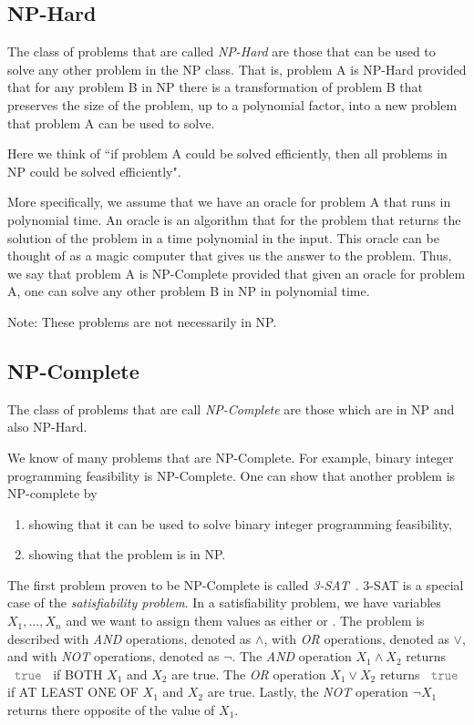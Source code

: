 \documentclass[../open-optimization/open-optimization.tex]{subfiles}
\begin{document}
\subsection{NP-Hard}
The class of problems that are called \emph{NP-Hard} are those that can be used to solve any other problem in the NP class.  
That is, problem A is NP-Hard provided that for any problem B in NP there is a transformation of problem B that preserves the size of the problem, up to a polynomial factor, into a new problem that problem A can be used to solve.

Here we think of ``if problem A could be solved efficiently, then all problems in NP could be solved efficiently".

More specifically, we assume that we have an oracle for problem A that runs in polynomial time.  An oracle is an algorithm that for the problem that returns the solution of the problem in a time polynomial in the input.   This oracle can be thought of as a magic computer that gives us the answer to the problem.   
Thus, we say that problem A is NP-Complete provided that given an oracle for problem A, one can solve any other problem B in NP in polynomial time.

Note:  These problems are not necessarily in NP.

\subsection{NP-Complete}
The class of problems that are call \emph{NP-Complete} are those which are in NP and also NP-Hard.  

We know of many problems that are NP-Complete.  For example, binary integer programming feasibility is NP-Complete.  One can show that another problem is NP-complete by 
\begin{enumerate}
\item showing that it can be used to solve binary integer programming feasibility,
\item showing that the problem is in NP.
\end{enumerate}

The first problem proven to be NP-Complete is called \emph{3-SAT}~\cite{}.  3-SAT is a special case of the \emph{satisfiability problem}.   In a satisfiability problem, we have variables $X_1, \dots, X_n$ and we want to assign them values as either \true or \false.  The problem is described with \emph{AND} operations, denoted as $\land$,  with \emph{OR} operations, denoted as $\lor$, and with \emph{NOT} operations, denoted as $\neg$.  The \emph{AND} operation $X_1 \land X_2$ returns $\true$ if BOTH $X_1$ and $X_2$ are true.  The \emph{OR} operation $X_1 \lor X_2$ returns $\true$ if AT LEAST ONE OF  $X_1$ and $X_2$ are true.  Lastly, the \emph{NOT} operation $\neg X_1$ returns there opposite of the value of $X_1$.
\end{document}
